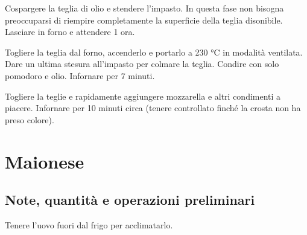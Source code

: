 \documentclass[12pt]{article}
\begin{document}
\begin{multicols}{2}
Cospargere la teglia di olio e stendere l'impasto.
In questa fase non bisogna preoccuparsi di riempire completamente la
superficie della teglia disonibile.
Lasciare in forno e attendere 1 ora.
\medskip

Togliere la teglia dal forno, accenderlo e portarlo a 230 °C in modalità ventilata.
Dare un ultima stesura all'impasto per colmare la teglia. Condire con solo pomodoro e olio.
Infornare per 7 minuti.
\medskip

Togliere la teglie e rapidamente aggiungere mozzarella e altri condimenti a piacere.
Infornare per 10 minuti circa (tenere controllato finché la crosta non ha preso colore).

\end{multicols}

\newpage


\section{Maionese}

\subsection*{Note, quantità e operazioni preliminari}
Tenere l'uovo fuori dal frigo per acclimatarlo.

\bigskip
\bigskip
\end{document}
